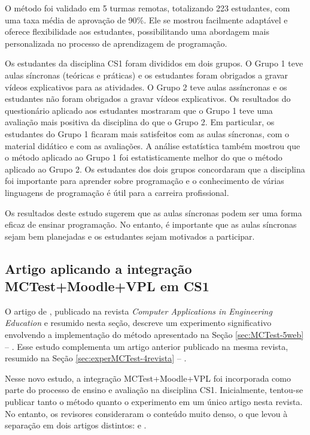 O método foi validado em 5 turmas remotas, totalizando 223 estudantes, com uma taxa média de aprovação de 90\%. Ele se mostrou facilmente adaptável e oferece flexibilidade aos estudantes, possibilitando uma abordagem mais personalizada no processo de aprendizagem de programação.

Os estudantes da disciplina CS1 foram divididos em dois grupos. O Grupo 1 teve aulas síncronas (teóricas e práticas) e os estudantes foram obrigados a gravar vídeos explicativos para as atividades. O Grupo 2 teve aulas assíncronas e os estudantes não foram obrigados a gravar vídeos explicativos. Os resultados do questionário aplicado aos estudantes mostraram que o Grupo 1 teve uma avaliação mais positiva da disciplina do que o Grupo 2. Em particular, os estudantes do Grupo 1 ficaram mais satisfeitos com as aulas síncronas, com o material didático e com as avaliações. A análise estatística também mostrou que o método aplicado ao Grupo 1 foi estatisticamente melhor do que o método aplicado ao Grupo 2.
%
Os estudantes dos dois grupos concordaram que a disciplina foi importante para aprender sobre programação e o conhecimento de várias linguagens de programação é útil para a carreira profissional.

Os resultados deste estudo sugerem que as aulas síncronas podem ser uma forma eficaz de ensinar programação. No entanto, é importante que as aulas síncronas sejam bem planejadas e os estudantes sejam motivados a participar.

\subsection{Artigo aplicando a integração MCTest+Moodle+VPL em CS1}

O artigo de , publicado na revista \textit{Computer Applications in Engineering Education} e resumido nesta seção, descreve um experimento significativo envolvendo a implementação do método apresentado na Seção \ref{sec:MCTest-5web} --  \cite{2020:Zampirolli.Pisani.ea}. Esse estudo complementa um artigo anterior publicado na mesma revista, resumido na Seção \ref{sec:experMCTest-4revista} --  \cite{2018:Zampirolli.Goya.ea}.

Nesse novo estudo, a integração MCTest+Moodle+VPL foi incorporada como parte do processo de ensino e avaliação na disciplina CS1. Inicialmente, tentou-se publicar tanto o método quanto o experimento em um único artigo nesta revista. No entanto, os revisores consideraram o conteúdo muito denso, o que levou à separação em dois artigos distintos:  e .


